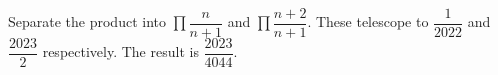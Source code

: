 Separate the product into $\prod\dfrac{n}{n+1}$ and $\prod\dfrac{n+2}{n+1}$. These telescope to $\dfrac{1}{2022}$ and $\dfrac{2023}{2}$ respectively. The result is $\boxed{\dfrac{2023}{4044}}$.
